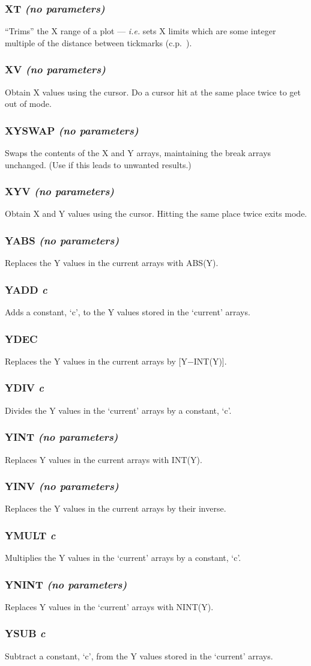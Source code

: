 \documentclass[twoside,11pt,noabs,nolof]{starlink}
\providecommand{\dipcom}[3]{\subsubsection*{\label{COM:#1}\textbf{#1} \emph{#2}}}
\begin{document}
\dipcom{XT}{(no parameters)}{Trims the X range to the nearest tick marks}
``Trims'' the X range of a plot --- \emph{i.e.} sets X limits which are
some integer multiple of the distance between tickmarks (c.p.\ ).

\dipcom{XV}{(no parameters)}{Obtains X values using the cursor}
Obtain X values using the cursor. Do a cursor hit at the same place
twice to get out of   mode.

\dipcom{XYSWAP}{(no parameters)}{Swaps the contents of the X and Y arrays}
Swaps the contents of the X and Y arrays, maintaining the break arrays
unchanged. (Use   if this leads to unwanted results.)

\dipcom{XYV}{(no parameters)}{Obtains X and Y values using the cursor}
Obtain X and Y values using the cursor. Hitting the same place twice
exits   mode.

\dipcom{YABS}{(no parameters)}{Replaces Y values in the current arrays with their absolute value}
Replaces the Y values in the current arrays with ABS(Y).

\dipcom{YADD}{c}{Adds a constant to the Y values in the current arrays}
Adds a constant, `c', to the Y values stored in the `current' arrays.

\dipcom{YDEC}{}{Replaces Y values in the current arrays by X-INT(X)}
Replaces the Y values in the current arrays by [Y$-$INT(Y)].

\dipcom{YDIV}{c}{Divides the Y values in the current array by a constant}
Divides the Y values in the `current' arrays by a constant, `c'.

\dipcom{YINT}{(no parameters)}{Replaces Y values in the current arrays by INT(X)}
Replaces Y values in the current arrays with INT(Y).

\dipcom{YINV}{(no parameters)}{Replaces Y values in the current arrays by 1/X}
Replaces the Y values in the current arrays by their inverse.

\dipcom{YMULT}{c}{Multiplies the Y values in the current arrays by a constant}
Multiplies the Y values in the `current' arrays by a constant, `c'.

\dipcom{YNINT}{(no parameters)}{Replaces Y values in the current arrays by the nearest integers}
Replaces Y values in the `current' arrays with NINT(Y).

\dipcom{YSUB}{c}{Subtracts a constant from the Y values in the current arrays}
Subtract a constant, `c', from the Y values stored in the `current' arrays.
\end{document}
